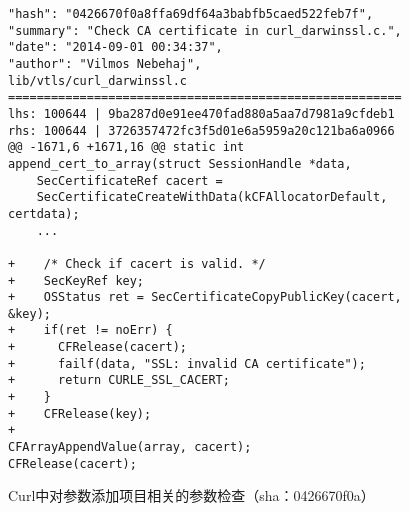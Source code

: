 \begin{figure}[t]
	\centering
\begin{lstlisting}
"hash": "0426670f0a8ffa69df64a3babfb5caed522feb7f",
"summary": "Check CA certificate in curl_darwinssl.c.",
"date": "2014-09-01 00:34:37",
"author": "Vilmos Nebehaj",
lib/vtls/curl_darwinssl.c
=======================================================
lhs: 100644 | 9ba287d0e91ee470fad880a5aa7d7981a9cfdeb1
rhs: 100644 | 3726357472fc3f5d01e6a5959a20c121ba6a0966
@@ -1671,6 +1671,16 @@ static int append_cert_to_array(struct SessionHandle *data,
	SecCertificateRef cacert =
	SecCertificateCreateWithData(kCFAllocatorDefault, certdata);
	...
	
+    /* Check if cacert is valid. */
+    SecKeyRef key;
+    OSStatus ret = SecCertificateCopyPublicKey(cacert, &key);
+    if(ret != noErr) {
+      CFRelease(cacert);
+      failf(data, "SSL: invalid CA certificate");
+      return CURLE_SSL_CACERT;
+    }
+    CFRelease(key);
+
CFArrayAppendValue(array, cacert);
CFRelease(cacert);

\end{lstlisting}
	\caption{
	Curl中对参数添加项目相关的参数检查（sha：0426670f0a）
	}
	\label{fig:2-3-fix}
\end{figure}